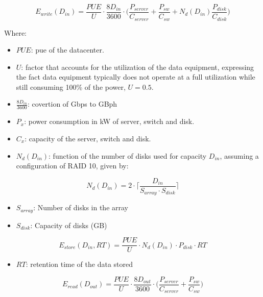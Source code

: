 \begin{equation}
\label{formula:tall_datacenter_write}
    E_{write}(D_{in}) = \frac{PUE}{U} \cdot \frac{8D_{in}}{3600} \cdot \bigg(\frac{P_{server}}{C_{server}} + \frac{P_{sw}}{C_{sw}} + N_d(D_{in}) \frac{P_{disk}}{C_{disk}}  \bigg) 
\end{equation}

Where:
\begin{itemize}
    \item $PUE$: \ac{pue} of the datacenter.
    \item $U$: factor that accounts for the utilization of the data equipment, expressing the fact data equipment typically does not operate at a full utilization while still consuming 100\% of the power, $U = 0.5$.
    \item $\frac{8D_{in}}{3600}$: covertion of Gbps to GBph
    \item $P_x$: power consumption in kW of server, switch and disk.
    \item $C_x$: capacity of the server, switch and disk.
    \item $N_d(D_{in})$: function of the number of disks used for capacity $D_{in}$, assuming a configuration of RAID 10, given by: 
\end{itemize}

\begin{equation}
\label{formula:tall_datacenter_ndisks}
    N_d(D_{in}) = 2 \cdot \bigg \lceil \frac{D_{in}}{S_{array} \cdot S_{disk}} \bigg \rceil
\end{equation}

\begin{itemize}
    \item $S_{array}$: Number of disks in the array
    \item $S_{disk}$: Capacity of disks (GB)
\end{itemize}

\begin{equation}
\label{formula:tall_datacenter_store}
    E_{store}(D_{in}, RT) = \frac{PUE}{U} \cdot N_d(D_{in}) \cdot P_{disk} \cdot RT
\end{equation}

\begin{itemize}
    \item $RT$: retention time of the data stored
\end{itemize}

\begin{equation}
\label{formula:tall_datacenter_read}
    E_{read}(D_{out}) = \frac{PUE}{U} \cdot \frac{8D_{out}}{3600} \cdot \bigg(\frac{P_{server}}{C_{server}} + \frac{P_{sw}}{C_{sw}}  \bigg)
\end{equation}


